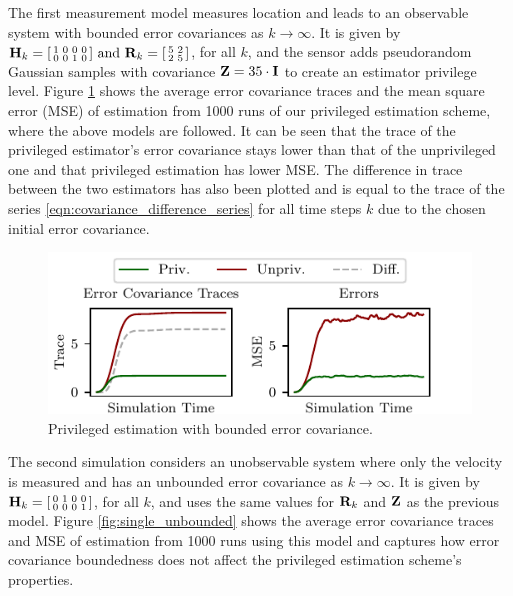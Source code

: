 \documentclass[letterpaper, 10 pt, conference]{ieeeconf}
\begin{document}
The first measurement model measures location and leads to an observable system with bounded error covariances as $k \rightarrow \infty$. It is given by 
$
   {{\mathbf{H}}}_k=
   \begin{bsmallmatrix}
      1 & 0 & 0 & 0\\
      0 & 0 & 1 & 0
   \end{bsmallmatrix}
   \text{ and }
   {\ensuremath{{\mathbf{R}}}}_k=
   \begin{bsmallmatrix}
      5 & 2\\
      2 & 5
   \end{bsmallmatrix}
$, 
for all $k$, and the sensor adds pseudorandom Gaussian samples with covariance ${{\mathbf{Z}}}=35 \cdot {\ensuremath{{\mathbf{I}}}}$ to create an estimator privilege level. Figure \ref{fig:single_bounded} shows the average error covariance traces and the mean square error (MSE) of estimation from 1000 runs of our privileged estimation scheme, where the above models are followed. It can be seen that the trace of the privileged estimator's error covariance stays lower than that of the unprivileged one and that privileged estimation has lower MSE. The difference in trace between the two estimators has also been plotted and is equal to the trace of the series \eqref{eqn:covariance_difference_series} for all time steps $k$ due to the chosen initial error covariance.

\begin{figure}[htbp]
   \centering
   \vspace{-.5 \baselineskip}
   \includegraphics{pictures/single_level_bounded.pdf}
   \caption{Privileged estimation with bounded error covariance.}
   \vspace{-.5 \baselineskip}
   \label{fig:single_bounded}
\end{figure}

The second simulation considers an unobservable system where only the velocity is measured and has an unbounded error covariance as $k \rightarrow \infty$. It is given by 
$
   {{\mathbf{H}}}_k=
   \begin{bsmallmatrix}
      0 & 1 & 0 & 0\\
      0 & 0 & 0 & 1
   \end{bsmallmatrix}
$, 
for all $k$, and uses the same values for ${{\mathbf{R}}}_k$ and ${{\mathbf{Z}}}$ as the previous model. Figure \ref{fig:single_unbounded} shows the average error covariance traces and MSE of estimation from 1000 runs using this model and captures how error covariance boundedness does not affect the privileged estimation scheme's properties.
\end{document}
